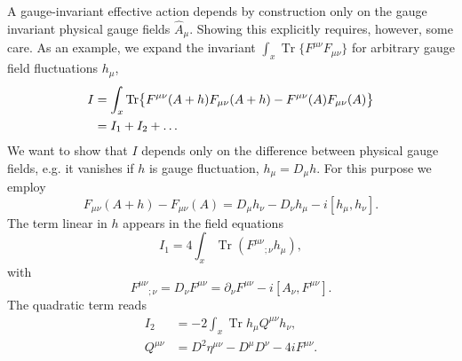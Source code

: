 \documentclass[twocolumn,aps,prd,amsmath,amssymb,preprintnumbers,longbibliography]{revtex4-1}
\numberwithin{equation}{section}
\DeclareMathOperator{\Tr}{Tr}
\newenvironment{alignedeqn}{\begin{equation}\begin{aligned}}{\end{aligned}\end{equation}\ignorespacesafterend}
\begin{document}
A gauge-invariant effective action depends by construction only on the gauge invariant physical gauge fields $\hat{A}_\mu$. Showing this explicitly requires, however, some care. As an example, we expand the invariant $\int_x \Tr\{F^{\mu\nu}F_{\mu\nu}\}$ for arbitrary gauge field fluctuations $h_\mu$,
\begin{align}\label{eqn:YX1}
	I
	&= \int_x \Tr\bigl\{F^{\mu\nu}(A + h)F_{\mu\nu}(A + h) - F^{\mu\nu}(A)F_{\mu\nu}(A)\bigr\}\notag\\
	&= I_1 + I_2 + \dots
\end{align}
We want to show that $I$ depends only on the difference between physical gauge fields, e.g. it vanishes if $h$ is gauge fluctuation, $h_{\mu}=D_{\mu}h$. For this purpose we employ
\begin{equation}\label{eqn:YX2}
	F_{\mu\nu}(A + h) - F_{\mu\nu}(A)
	= D_\mu h_\nu - D_\nu h_\mu - i [h_\mu,h_\nu].
\end{equation}
The term linear in $h$ appears in the field equations
\begin{equation}\label{eqn:YX3}
	I_1
	= 4 \int_x \Tr(F^{\mu\nu}{_{;\nu}}h_\mu),
\end{equation}
with
\begin{equation}\label{eqn:284A}
	F^{\mu\nu}{_{;\nu}}
	= D_\nu F^{\mu\nu}
	= \partial_\nu F^{\mu\nu} - i [A_\nu,F^{\mu\nu}].
\end{equation}
The quadratic term reads
\begin{alignedeqn}\label{eqn:YX4}
	I_2
	&= -2 \int_x \Tr h_\mu Q^{\mu\nu}h_\nu,\\
	Q^{\mu\nu}
	&= D^2\eta^{\mu\nu} - D^\mu D^\nu - 4iF^{\mu\nu}.
\end{alignedeqn}
\end{document}
